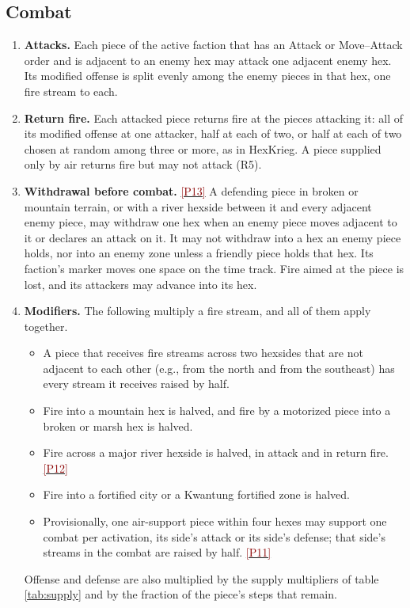 \documentclass[11pt]{article}
\newcommand{\ptest}[1]{\hyperlink{ptest}{\textcolor{darkred}{[P#1]}}}
\begin{document}
\subsection{Combat}\label{sub:combat}
\begin{enumerate}
\item \textbf{Attacks.} Each piece of the active faction that has an Attack or Move--Attack order and is adjacent to an enemy hex may attack one adjacent enemy hex. Its modified offense is split evenly among the enemy pieces in that hex, one fire stream to each.
\item \textbf{Return fire.} Each attacked piece returns fire at the pieces attacking it: all of its modified offense at one attacker, half at each of two, or half at each of two chosen at random among three or more, as in HexKrieg. A piece supplied only by air returns fire but may not attack (R5).
\item \textbf{Withdrawal before combat.} \ptest{13} A defending piece in broken or mountain terrain, or with a river hexside between it and every adjacent enemy piece, may withdraw one hex when an enemy piece moves adjacent to it or declares an attack on it. It may not withdraw into a hex an enemy piece holds, nor into an enemy zone unless a friendly piece holds that hex. Its faction's marker moves one space on the time track. Fire aimed at the piece is lost, and its attackers may advance into its hex.
\item \textbf{Modifiers.} The following multiply a fire stream, and all of them apply together.
\begin{itemize}
\item A piece that receives fire streams across two hexsides that are not adjacent to each other (e.g., from the north and from the southeast) has every stream it receives raised by half.
\item Fire into a mountain hex is halved, and fire by a motorized piece into a broken or marsh hex is halved.
\item Fire across a major river hexside is halved, in attack and in return fire. \ptest{12}
\item Fire into a fortified city or a Kwantung fortified zone is halved.
\item Provisionally, one air-support piece within four hexes may support one combat per activation, its side's attack or its side's defense; that side's streams in the combat are raised by half. \ptest{11}
\end{itemize}
Offense and defense are also multiplied by the supply multipliers of table \ref{tab:supply} and by the fraction of the piece's steps that remain.

\end{enumerate}
\end{document}
